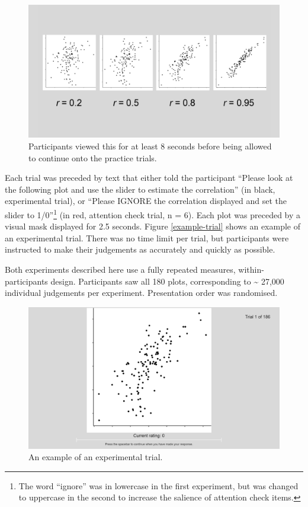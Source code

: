 \documentclass[preprint, 3p,
authoryear]{elsarticle} %
\begin{document}
\begin{figure}

\includegraphics[width=0.5\linewidth]{images/example-plots} \hfill{}

\caption{\label{example-plots}Participants viewed this for at least 8 seconds before being allowed to continue onto the practice trials.}\label{fig:example-plots}
\end{figure}

Each trial was preceded by text that either told the participant
``Please look at the following plot and use the slider to estimate the
correlation'' (in black, experimental trial), or ``Please IGNORE the
correlation displayed and set the slider to 1/0''\footnote{The word
  ``ignore'' was in lowercase in the first experiment, but was changed
  to uppercase in the second to increase the salience of attention check
  items.} (in red, attention check trial, n = 6). Each plot was preceded
by a visual mask displayed for 2.5 seconds. Figure \ref{example-trial}
shows an example of an experimental trial. There was no time limit per
trial, but participants were instructed to make their judgements as
accurately and quickly as possible.

Both experiments described here use a fully repeated measures,
within-participants design. Participants saw all 180 plots,
corresponding to \textasciitilde{} 27,000 individual judgements per
experiment. Presentation order was randomised.

\begin{figure}

\includegraphics[width=0.5\linewidth]{images/example-trial} \hfill{}

\caption{\label{example-trial}An example of an experimental trial.}\label{fig:example-trial}
\end{figure}
\end{document}
